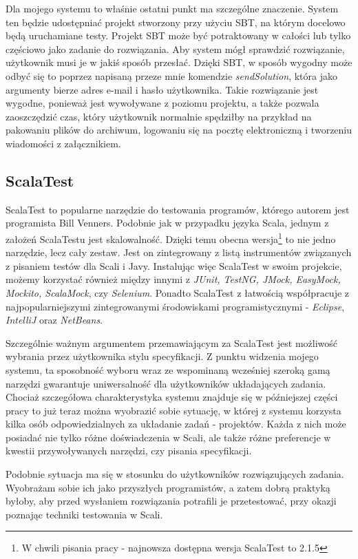 \documentclass[brudnopis]{xmgr}
\begin{document}
Dla mojego systemu to właśnie ostatni punkt ma szczególne znaczenie. System ten będzie udostępniać projekt stworzony przy użyciu SBT, na którym docelowo będą uruchamiane testy. Projekt SBT może być potraktowany w całości lub tylko częściowo jako zadanie do rozwiązania. Aby system mógł sprawdzić rozwiązanie, użytkownik musi je w jakiś sposób przesłać. Dzięki SBT, w sposób wygodny może odbyć się to poprzez napisaną przeze mnie komendzie \emph{sendSolution}, która jako argumenty bierze adres e-mail i hasło użytkownika. Takie rozwiązanie jest wygodne, ponieważ jest wywoływane z poziomu projektu, a także pozwala zaoszczędzić czas, który użytkownik normalnie spędziłby na przykład na pakowaniu plików do archiwum, logowaniu się na pocztę elektroniczną i tworzeniu wiadomości z załącznikiem.

\subsection{ScalaTest} 

ScalaTest to popularne narzędzie do testowania programów, którego autorem jest programista Bill Venners. Podobnie jak w przypadku języka Scala, jednym z założeń ScalaTestu jest skalowalność. Dzięki temu obecna wersja\footnote{W chwili pisania pracy - najnowsza dostępna wersja ScalaTest to 2.1.5} to nie jedno narzędzie, lecz cały zestaw. Jest on zintegrowany z listą instrumentów związanych z pisaniem testów dla Scali i Javy. Instalując więc ScalaTest w swoim projekcie, możemy korzystać również między innymi z \textit{JUnit, TestNG, JMock, EasyMock, Mockito, ScalaMock}, czy \textit{Selenium}. Ponadto ScalaTest z łatwością współpracuje z najpopularniejszymi zintegrowanymi środowiskami programistycznymi - \textit{Eclipse}, \textit{IntelliJ} oraz \textit{NetBeans}.

Szczególnie ważnym argumentem przemawiającym za ScalaTest jest możliwość wybrania przez użytkownika stylu specyfikacji. Z punktu widzenia mojego systemu, ta sposobność wyboru wraz ze wspominaną wcześniej szeroką gamą narzędzi gwarantuje uniwersalność dla użytkowników układających zadania. Chociaż szczegółowa charakterystyka systemu znajduje się w późniejszej części pracy to już teraz można wyobrazić sobie sytuację, w której z systemu korzysta kilka osób odpowiedzialnych za układanie zadań - projektów. Każda z nich może posiadać nie tylko różne doświadczenia w Scali, ale także różne preferencje w kwestii przywoływanych narzędzi, czy pisania specyfikacji. 

Podobnie sytuacja ma się w stosunku do użytkowników rozwiązujących zadania. Wyobrażam sobie ich jako przyszłych programistów, a zatem dobrą praktyką byłoby, aby przed wysłaniem rozwiązania potrafili je przetestować, przy okazji poznając techniki testowania w Scali. 
\end{document}
